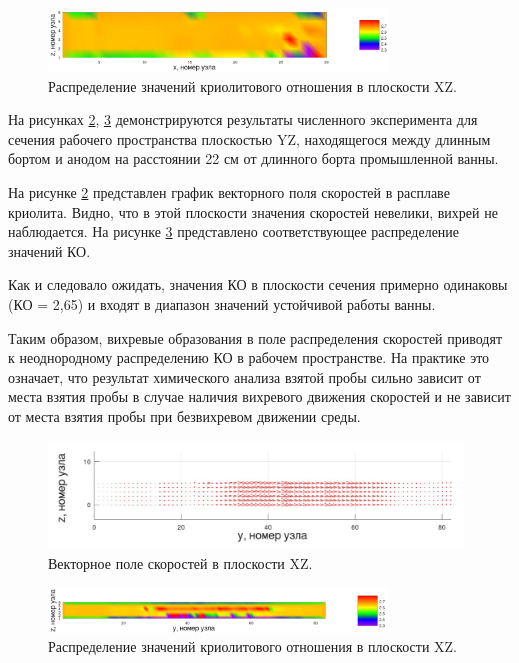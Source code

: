 \documentclass[]{pmi}
\begin{document}
\begin{figure}[H]
    \centering
    \includegraphics[width=90mm]{heatmapxz_art.png}
    \caption{Распределение значений криолитового отношения в плоскости XZ.}
    \label{fig:crxz} 
\end{figure}

На рисунках \ref{fig:veloyz}, \ref{fig:cryz} демонстрируются результаты численного эксперимента для сечения рабочего пространства плоскостью YZ, находящегося между длинным бортом и анодом на расстоянии 22 см от длинного борта промышленной ванны.	

На рисунке \ref{fig:veloyz} представлен график векторного поля скоростей в расплаве криолита. Видно, что в этой плоскости значения скоростей невелики, вихрей не наблюдается. На рисунке \ref{fig:cryz} представлено соответствующее распределение значений КО.

Как и следовало ожидать, значения КО в плоскости сечения примерно одинаковы (КО = 2,65) и входят в диапазон значений устойчивой работы ванны. 

Таким образом, вихревые образования в поле распределения скоростей приводят к неоднородному распределению КО в рабочем пространстве. На практике это означает, что результат химического анализа взятой пробы сильно зависит от места взятия пробы в случае наличия вихревого движения скоростей и не зависит от места взятия пробы при безвихревом движении среды.

\begin{figure}[H]
    \centering
    \includegraphics[width=110mm]{veloyz_art.png}
    \caption{Векторное поле скоростей в плоскости XZ.}
    \label{fig:veloyz} 
\end{figure}

\begin{figure}[H]
    \centering
    \includegraphics[width=90mm]{heatmapyz_art.png}
    \caption{Распределение значений криолитового отношения в плоскости XZ.}
    \label{fig:cryz} 
\end{figure}
\end{document}
